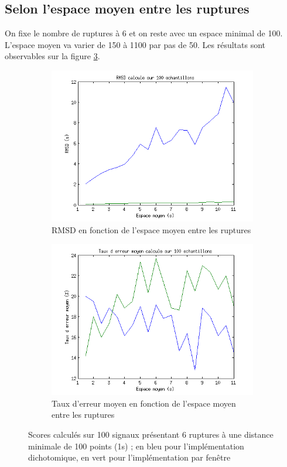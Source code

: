 \documentclass[french,11pt,notitlepage]{report}
\begin{document}
	
	\subsection{Selon l'espace moyen entre les ruptures}
	
	
	On fixe le nombre de ruptures à 6 et on reste avec un espace minimal de 100.
	L'espace moyen va varier de 150 à 1100 par pas de 50.
		Les résultats sont observables sur la figure \ref{score_mean}.
		
	\begin{figure}[hp]
		\begin{subfigure}[t]{.49\textwidth}
		  \includegraphics[width=\linewidth,height=.24\textheight]{rmsd_mean}
			\caption{RMSD en fonction de l'espace moyen entre les ruptures}
			\label{}
		\end{subfigure}
		\hfill
		\begin{subfigure}[t]{.49\textwidth}
			\includegraphics[width=\linewidth,height=.24\textheight]{erratemean_mean}
			\caption{Taux d'erreur moyen en fonction de l'espace moyen entre les ruptures}
			\label{}
		\end{subfigure}
	\caption{Scores calculés sur 100 signaux présentant 6 ruptures à une distance minimale de 100 points (1s) ; en bleu pour l'implémentation dichotomique, en vert pour l'implémentation par fenêtre}
	\label{score_mean}
	\end{figure}
	
\end{document}
